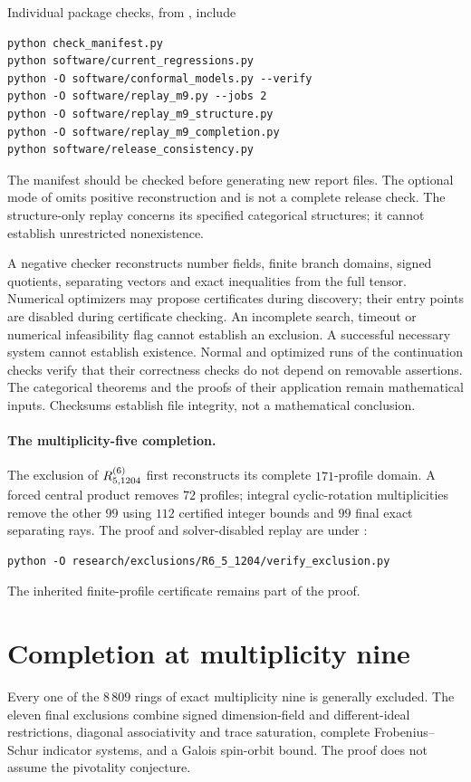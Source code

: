 \documentclass[11pt]{article}
\begin{document}
Individual package checks, from , include
\begin{verbatim}
python check_manifest.py
python software/current_regressions.py
python -O software/conformal_models.py --verify
python -O software/replay_m9.py --jobs 2
python -O software/replay_m9_structure.py
python -O software/replay_m9_completion.py
python software/release_consistency.py
\end{verbatim}
The manifest should be checked before generating new report files.
The optional  mode of 
omits positive reconstruction and is not a complete release check.
The structure-only replay concerns its specified categorical structures;
it cannot establish unrestricted nonexistence.

A negative checker reconstructs number fields, finite branch domains,
signed quotients, separating vectors and exact inequalities from the
full tensor. Numerical optimizers may propose certificates during
discovery; their entry points are disabled during certificate checking.
An incomplete search, timeout or numerical infeasibility flag cannot
establish an exclusion. A successful necessary system cannot establish
existence. Normal and optimized runs of the continuation checks verify
that their correctness checks do not depend on removable assertions.
The categorical theorems and the proofs of their application remain
mathematical inputs. Checksums establish file integrity, not a
mathematical conclusion.

\paragraph{The multiplicity-five completion.}
The exclusion of $R^{(6)}_{5,1204}$ first reconstructs its complete
$171$-profile domain. A forced central product removes $72$ profiles;
integral cyclic-rotation multiplicities remove the other $99$ using
$112$ certified integer bounds and $99$ final exact separating rays.
The proof and solver-disabled replay are under
:
\begin{verbatim}
python -O research/exclusions/R6_5_1204/verify_exclusion.py
\end{verbatim}
The inherited finite-profile certificate remains part of the proof.

\section{Completion at multiplicity nine}
Every one of the $8\,809$ rings of exact multiplicity nine is generally
excluded. The eleven final exclusions combine signed dimension-field and
different-ideal restrictions, diagonal associativity and trace saturation,
complete Frobenius--Schur indicator systems, and a Galois spin-orbit bound.
The proof does not assume the pivotality conjecture.
\end{document}
